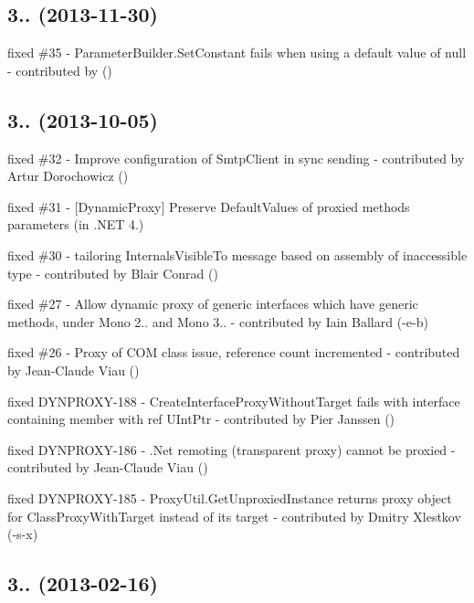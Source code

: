 \subsection*{3.. (2013-\/11-\/30)}


\begin{DoxyItemize}
\item fixed \#35 -\/ Parameter\+Builder.\+Set\+Constant fails when using a default value of null -\/ contributed by ()
\end{DoxyItemize}

\subsection*{3.. (2013-\/10-\/05)}


\begin{DoxyItemize}
\item fixed \#32 -\/ Improve configuration of Smtp\+Client in sync sending -\/ contributed by Artur Dorochowicz ()
\item fixed \#31 -\/ [Dynamic\+Proxy] Preserve Default\+Values of proxied method\textquotesingle{}s parameters (in .N\+ET 4.)
\item fixed \#30 -\/ tailoring Internals\+Visible\+To message based on assembly of inaccessible type -\/ contributed by Blair Conrad ()
\item fixed \#27 -\/ Allow dynamic proxy of generic interfaces which have generic methods, under Mono 2.. and Mono 3.. -\/ contributed by Iain Ballard (-\/e-\/b)
\item fixed \#26 -\/ Proxy of C\+OM class issue, reference count incremented -\/ contributed by Jean-\/\+Claude Viau ()
\item fixed D\+Y\+N\+P\+R\+O\+X\+Y-\/188 -\/ Create\+Interface\+Proxy\+Without\+Target fails with interface containing member with \textquotesingle{}ref U\+Int\+Ptr\textquotesingle{} -\/ contributed by Pier Janssen ()
\item fixed D\+Y\+N\+P\+R\+O\+X\+Y-\/186 -\/ .Net remoting (transparent proxy) cannot be proxied -\/ contributed by Jean-\/\+Claude Viau ()
\item fixed D\+Y\+N\+P\+R\+O\+X\+Y-\/185 -\/ Proxy\+Util.\+Get\+Unproxied\+Instance returns proxy object for Class\+Proxy\+With\+Target instead of its target -\/ contributed by Dmitry Xlestkov (-\/s-\/x)
\end{DoxyItemize}

\subsection*{3.. (2013-\/02-\/16)}



